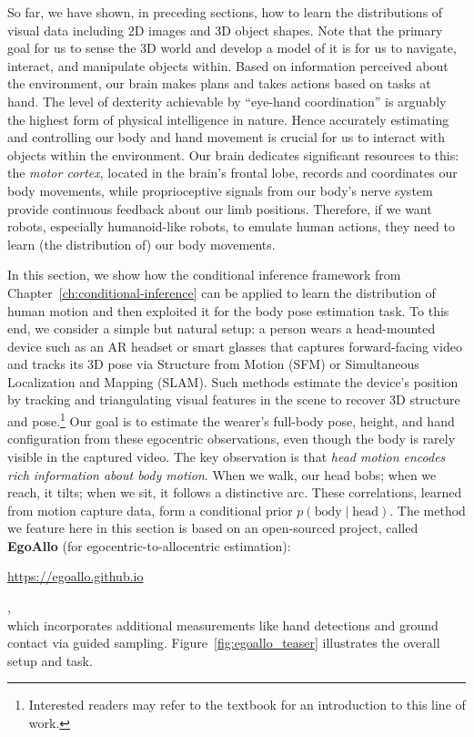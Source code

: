 \documentclass[../../book-main.tex]{subfiles}
\begin{document}
So far, we have shown, in preceding sections, how to learn the
distributions of visual data including 2D images and 3D object
shapes. Note that the primary goal for us to sense the 3D world and
develop a model of it is for us to navigate, interact, and manipulate
objects within. Based on information perceived about the environment,
our brain makes plans and takes actions based on tasks at hand. The
level of dexterity achievable by ``eye-hand coordination'' is
arguably the highest form of physical intelligence in nature. Hence
accurately estimating and controlling our body and hand movement is
crucial for us to interact with objects within the environment. Our
brain dedicates significant resources to this: the {\em motor
cortex}, located in the brain's frontal lobe, records and coordinates
our body movements, while proprioceptive signals from our body's
nerve system provide continuous feedback about our limb positions.
Therefore, if we want robots, especially humanoid-like robots, to
emulate human actions, they need to learn (the distribution of) our
body movements.

In this section, we show how the conditional inference framework from
Chapter~\ref{ch:conditional-inference} can be applied to learn the
distribution of human motion and then exploited it for the body pose
estimation task. To this end, we consider a simple but natural setup:
a person wears a head-mounted device such as an AR headset or smart
glasses that captures forward-facing video and  tracks its 3D pose
via Structure from Motion (SFM) or Simultaneous Localization and
Mapping (SLAM). Such methods estimate the device's position by
tracking and triangulating visual features in the scene to recover 3D
structure and pose.\footnote{Interested readers may refer to the
textbook \cite{MaY2003} for an introduction to this line of work.}
Our goal is to estimate the wearer's full-body pose, height, and hand
configuration from these egocentric observations, even though the
body is rarely visible in the captured video. The key observation is
that \emph{head motion encodes rich information about body motion}.
When we walk, our head bobs; when we reach, it tilts; when we sit, it
follows a distinctive arc. These correlations, learned from motion
capture data, form a conditional prior $p(\text{body} \mid
\text{head})$. The method we feature here in this section is based on
an open-sourced project, called \textbf{EgoAllo} (for
egocentric-to-allocentric estimation):\\
\centerline{\url{https://egoallo.github.io}},\\
which incorporates additional measurements like hand detections and
ground contact via guided sampling. Figure~\ref{fig:egoallo_teaser}
illustrates the overall setup and task.
\end{document}
